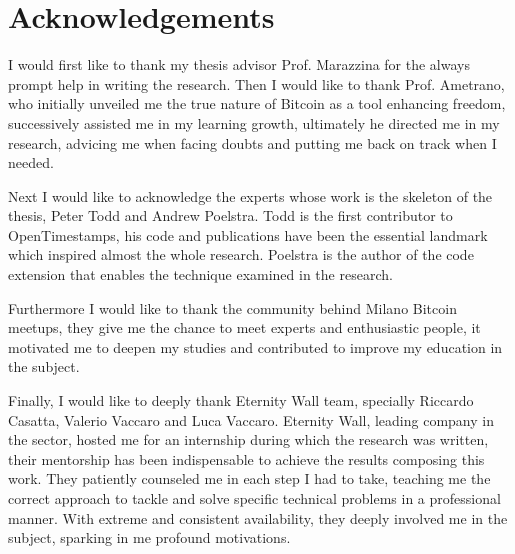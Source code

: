 \chapter{Acknowledgements}
\label{chpr:acknowledgement}

I would first like to thank my thesis advisor Prof. Marazzina for the always prompt help in writing the research.
Then I would like to thank Prof. Ametrano, who initially unveiled me the true nature of Bitcoin as a tool enhancing freedom, successively assisted me in my learning growth, ultimately he directed me in my research, advicing me when facing doubts and putting me back on track when I needed. 

Next I would like to acknowledge the experts whose work is the skeleton of the thesis, Peter Todd and Andrew Poelstra.
Todd is the first contributor to OpenTimestamps, his code and publications have been the essential landmark which inspired almost the whole research.
Poelstra is the author of the code extension that enables the technique examined in the research.

Furthermore I would like to thank the community behind Milano Bitcoin meetups, they give me the chance to meet experts and enthusiastic people, it motivated me to deepen my studies and contributed to improve my education in the subject.

Finally, I would like to deeply thank Eternity Wall team, specially Riccardo Casatta, Valerio Vaccaro and Luca Vaccaro.
Eternity Wall, leading company in the sector, hosted me for an internship during which the research was written, 
their mentorship has been indispensable to achieve the results composing this work.
They patiently counseled me in each step I had to take, teaching me the correct approach to tackle and solve specific technical problems in a professional manner. 
With extreme and consistent availability, they deeply involved me in the subject, sparking in me profound motivations.